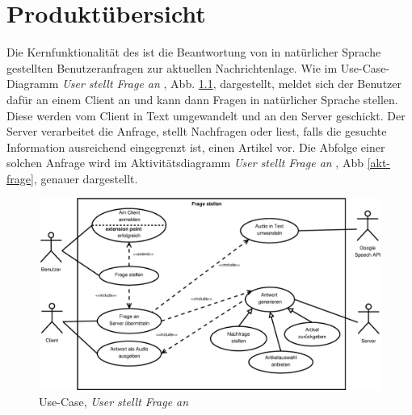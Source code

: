 
\chapter{Produktübersicht}

Die Kernfunktionalität des \NewsGenie ist die Beantwortung von in natürlicher
Sprache gestellten Benutzeranfragen zur aktuellen Nachrichtenlage. Wie im
Use-Case-Diagramm \textit{User stellt Frage an \NewsGenie}, Abb. \ref{uc-frage}, 
dargestellt, meldet sich der Benutzer dafür an einem Client an und kann dann
Fragen in natürlicher Sprache stellen. Diese werden vom Client in Text
umgewandelt und an den Server geschickt. Der Server verarbeitet die Anfrage, 
stellt Nachfragen oder liest, falls die gesuchte Information ausreichend
eingegrenzt ist, einen Artikel vor.
Die Abfolge einer solchen Anfrage wird im Aktivitätsdiagramm \textit{User stellt
Frage an \NewsGenie}, Abb \ref{akt-frage},  genauer dargestellt.

\begin{figure}[h]
\centering
\includegraphics[width=1\textwidth]{Pflichtenheft/03_produktuebersicht/frage_stellen}
\caption{Use-Case, \textit{User stellt Frage an \NewsGenie} \label{uc-frage}}
\end{figure}


